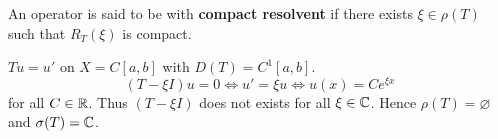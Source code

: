 \begin{definition}
    An operator is said to be with \textbf{compact resolvent} if there exists 
    $\xi\in\rho(T)$ such that $R_T(\xi)$ is compact.
\end{definition}

\begin{example}
    $Tu = u'$ on $X = C[a,b]$ with $D(T) = C^1[a,b]$. 
    \begin{equation*}
        (T-\xi I)u = 0 \Leftrightarrow u' = \xi u \Leftrightarrow u(x) = Ce^{\xi x}
    \end{equation*}
    for all $C\in\mathbb{R}$. Thus $(T-\xi I)$ does not exists for all $\xi\in\mathbb{C}$. 
    Hence $\rho(T) = \varnothing$ and $\sigma(T) = \mathbb{C}$.
\end{example}